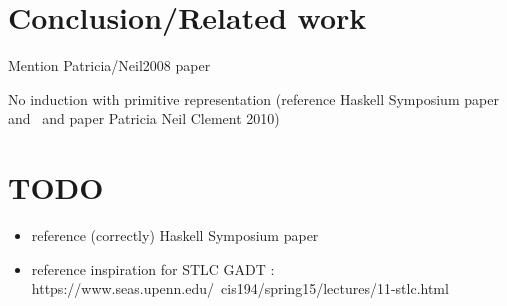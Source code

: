\documentclass[acmsmall,screen,review,anonymous]{acmart}
\theoremstyle{definition}
\begin{document}




\section{Conclusion/Related work}

Mention Patricia/Neil2008 paper

No induction with primitive representation (reference Haskell Symposium paper and~\cite{jp19} and paper Patricia Neil Clement 2010)


\section{TODO}

\begin{itemize}
\item reference (correctly) Haskell Symposium paper
\item reference inspiration for STLC GADT : https://www.seas.upenn.edu/~cis194/spring15/lectures/11-stlc.html

\end{itemize}


%
%



\end{document}
